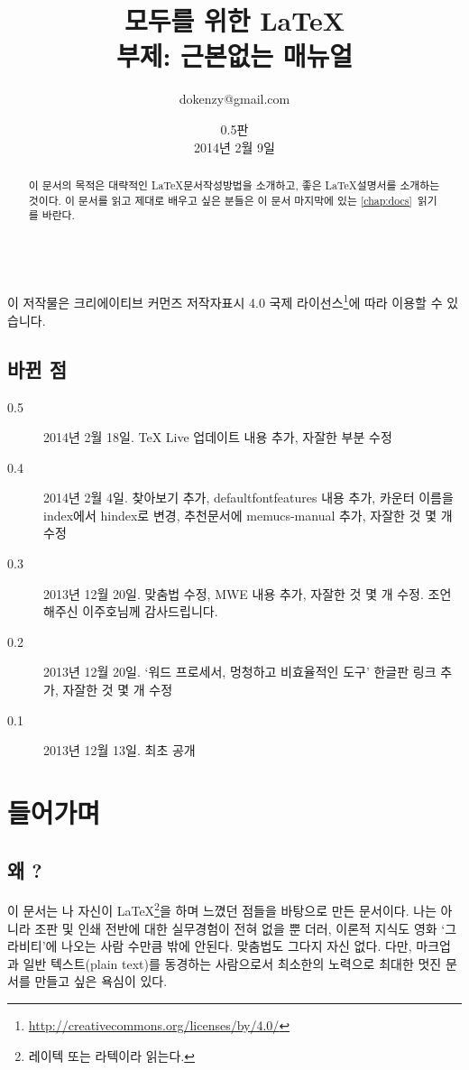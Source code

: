 \documentclass[oneside, chapter, 11pt]{oblivoir}
\title{모두를 위한 \LaTeX\\\small{부제: 근본없는 매뉴얼}}
\author{dokenzy@gmail.com}
\date{0.5판\\2014년 2월 9일}
\newcounter{hindex}
\begin{document}
\maketitle
\begin{abstract}
이 문서의 목적은 대략적인 \LaTeX 문서작성방법을 소개하고, 좋은 \LaTeX 설명서를 소개하는 것이다. 이 문서를 읽고  제대로 배우고 싶은 분들은 이 문서 마지막에 있는 \ref{chap:docs}\chaptername~\을 읽기를 바란다.
\end{abstract}

\begin{center}
\ccbyncsa\\
{\scriptsize 이 저작물은 크리에이티브 커먼즈 저작자표시 4.0 국제 라이선스\footnote{\href{http://creativecommons.org/licenses/by/4.0/}{http://creativecommons.org/licenses/by/4.0/}}에 따라 이용할 수 있습니다.}
\end{center}

\clearpage
\section*{바뀐 점}
\begin{description}
\item[0.5] 2014년 2월 18일. TeX Live 업데이트 내용 추가, 자잘한 부분 수정
\item[0.4] 2014년 2월 4일. 찾아보기 추가, defaultfontfeatures 내용 추가, 카운터 이름을 index에서 hindex로 변경, 추천문서에 memucs-manual 추가, 자잘한 것 몇 개 수정
\item[0.3] 2013년 12월 20일. 맞춤법 수정, MWE 내용 추가, 자잘한 것 몇 개 수정. 조언해주신 이주호님께 감사드립니다.
\item[0.2] 2013년 12월 20일. `워드 프로세서, 멍청하고 비효율적인 도구' 한글판 링크 추가, 자잘한 것 몇 개 수정
\item[0.1] 2013년 12월 13일. 최초 공개
\end{description}
\clearpage

\tableofcontents

\frontmatter
\chapter{들어가며}
\section{왜 ?}
이 문서는 나 자신이 \LaTeX\footnote{레이텍 또는 라텍이라 읽는다.}을 하며 느꼈던 점들을 바탕으로 만든  문서이다. 나는  아니라 조판 및 인쇄 전반에 대한 실무경험이 전혀 없을 뿐 더러, 이론적 지식도 영화 `그라비티'에 나오는 사람 수만큼 밖에 안된다. 맞춤법도 그다지 자신 없다. 다만, 마크업과 일반 텍스트(plain text)를 동경하는 사람으로서 최소한의 노력으로 최대한 멋진 문서를 만들고 싶은 욕심이 있다. 
\end{document}
